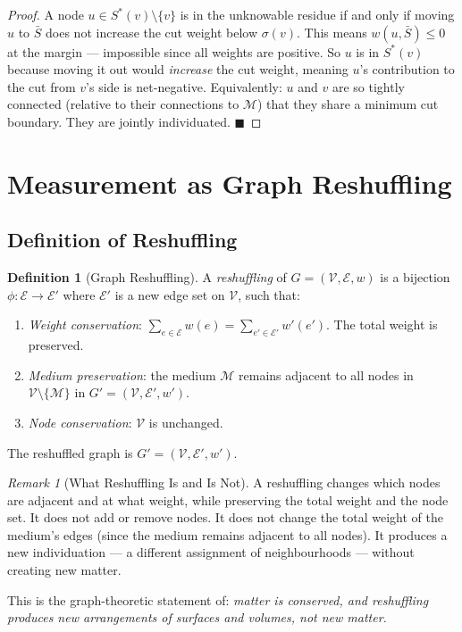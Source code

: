 \documentclass[12pt, a4paper]{article}
\theoremstyle{plain}
\theoremstyle{definition}
\newtheorem{definition}[theorem]{Definition}
\theoremstyle{remark}
\newtheorem{remark}[theorem]{Remark}
\newcommand{\med}{\mathcal{M}}
\newcommand{\Ecal}{\mathcal{E}}
\newcommand{\Vcal}{\mathcal{V}}
\newcommand{\qed}{\hfill$\blacksquare$}
\begin{document}
\begin{proof}
A node $u \in S^*(v) \setminus \{v\}$ is in the unknowable residue if and only
if moving $u$ to $\bar{S}$ does not increase the cut weight below $\sigma(v)$.
This means $w(u, \bar{S}) \leq 0$ at the margin --- impossible since all
weights are positive. So $u$ is in $S^*(v)$ because moving it out would
\emph{increase} the cut weight, meaning $u$'s contribution to the cut from
$v$'s side is net-negative. Equivalently: $u$ and $v$ are so tightly connected
(relative to their connections to $\med$) that they share a minimum cut
boundary. They are jointly individuated. \qed
\end{proof}

\section{Measurement as Graph Reshuffling}
\label{sec:reshuffling}

\subsection{Definition of Reshuffling}

\begin{definition}[Graph Reshuffling]
\label{def:reshuffling}
A \emph{reshuffling} of $G = (\Vcal, \Ecal, w)$ is a bijection
$\phi: \Ecal \to \Ecal'$ where $\Ecal'$ is a new edge set on $\Vcal$,
such that:
\begin{enumerate}[label=(\roman*)]
  \item \emph{Weight conservation}: $\sum_{e \in \Ecal} w(e) = \sum_{e'
  \in \Ecal'} w'(e')$. The total weight is preserved.
  \item \emph{Medium preservation}: the medium $\med$ remains adjacent to
  all nodes in $\Vcal \setminus \{\med\}$ in $G' = (\Vcal, \Ecal', w')$.
  \item \emph{Node conservation}: $\Vcal$ is unchanged.
\end{enumerate}
The reshuffled graph is $G' = (\Vcal, \Ecal', w')$.
\end{definition}

\begin{remark}[What Reshuffling Is and Is Not]
A reshuffling changes which nodes are adjacent and at what weight, while
preserving the total weight and the node set. It does not add or remove
nodes. It does not change the total weight of the medium's edges (since
the medium remains adjacent to all nodes). It produces a new individuation
--- a different assignment of neighbourhoods --- without creating new matter.

This is the graph-theoretic statement of: \emph{matter is conserved, and
reshuffling produces new arrangements of surfaces and volumes, not new matter.}
\end{remark}
\end{document}
